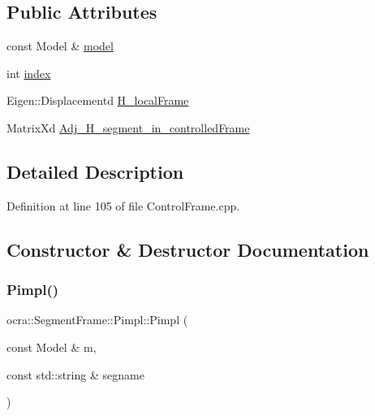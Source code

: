 \subsection*{Public Attributes}
\begin{DoxyCompactItemize}
\item 
const Model \& \hyperlink{structocra_1_1SegmentFrame_1_1Pimpl_a787a1cc368ab12229ecd11358e2805e1}{model}
\item 
int \hyperlink{structocra_1_1SegmentFrame_1_1Pimpl_aeeadbd2b42d3e0cf750cbc0df50f213c}{index}
\item 
Eigen\+::\+Displacementd \hyperlink{structocra_1_1SegmentFrame_1_1Pimpl_a5e0d767dc540fbd56b1e6f125ba7abf6}{H\+\_\+local\+Frame}
\item 
Matrix\+Xd \hyperlink{structocra_1_1SegmentFrame_1_1Pimpl_a3b188df19a7b138373a1861dfa5aad1d}{Adj\+\_\+\+H\+\_\+segment\+\_\+in\+\_\+controlled\+Frame}
\end{DoxyCompactItemize}


\subsection{Detailed Description}


Definition at line 105 of file Control\+Frame.\+cpp.



\subsection{Constructor \& Destructor Documentation}
\hypertarget{structocra_1_1SegmentFrame_1_1Pimpl_a3e4a372b7ffde0baf617f8097a4d9285}{}\label{structocra_1_1SegmentFrame_1_1Pimpl_a3e4a372b7ffde0baf617f8097a4d9285} 
\subsubsection{\texorpdfstring{Pimpl()}{Pimpl()}\hspace{0.1cm}{\footnotesize\ttfamily [1/4]}}
{\footnotesize\ttfamily ocra\+::\+Segment\+Frame\+::\+Pimpl\+::\+Pimpl (\begin{DoxyParamCaption}\item[{const Model \&}]{m,  }\item[{const std\+::string \&}]{segname }\end{DoxyParamCaption})\hspace{0.3cm}{\ttfamily [inline]}}



